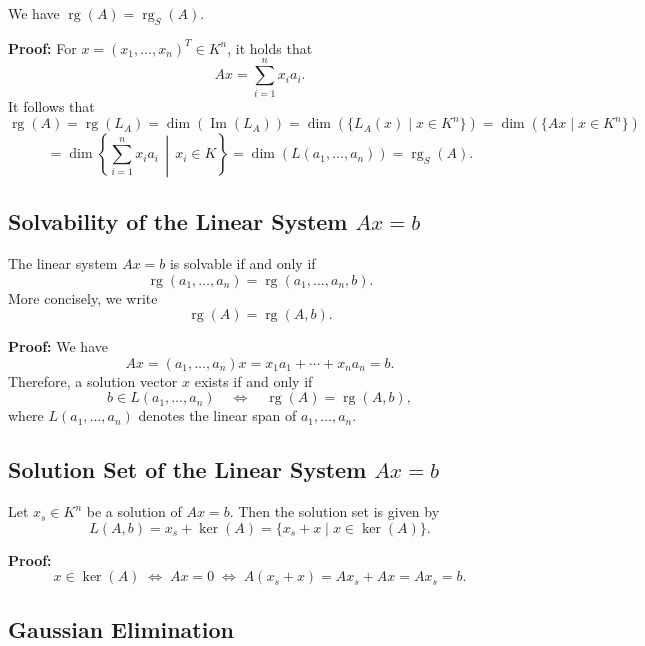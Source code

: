 We have \(\operatorname{rg}(A) = \operatorname{rg}_S(A)\).

\textbf{Proof:} For \(x = {(x_1, \ldots, x_n)}^T \in K^n\), it holds that
\[
Ax = \sum_{i=1}^{n} x_i a_i.
\]
It follows that
\[
\operatorname{rg}(A) = \operatorname{rg}(L_A) = \dim(\operatorname{Im}(L_A))
= \dim\left(\{L_A(x) \mid x \in K^n\}\right)
= \dim\left(\{Ax \mid x \in K^n\}\right)
\]
\[
= \dim\left\{ \sum_{i=1}^{n} x_i a_i \,\middle|\, x_i \in K \right\}
= \dim(L(a_1, \ldots, a_n)) = \operatorname{rg}_S(A).
\]

\subsection{Solvability of the Linear System \texorpdfstring{\(Ax = b\)}{}}

The linear system \(Ax = b\) is solvable if and only if
\[
\operatorname{rg}(a_1, \ldots, a_n) = \operatorname{rg}(a_1, \ldots, a_n, b).
\]
More concisely, we write
\[
\operatorname{rg}(A) = \operatorname{rg}(A, b).
\]

\textbf{Proof:} We have
\[
Ax = (a_1, \ldots, a_n)x = x_1 a_1 + \cdots + x_n a_n = b.
\]
Therefore, a solution vector \(x\) exists if and only if
\[
b \in L(a_1, \ldots, a_n) \quad \Leftrightarrow \quad \operatorname{rg}(A) = \operatorname{rg}(A, b),
\]
where \(L(a_1, \ldots, a_n)\) denotes the linear span of \(a_1, \ldots, a_n\).

\subsection{Solution Set of the Linear System \texorpdfstring{\(Ax = b\)}{}}

Let \(x_s \in K^n\) be a solution of \(Ax = b\). Then the solution set is given by
\[
L(A, b) = x_s + \ker(A) = \{x_s + x \mid x \in \ker(A)\}.
\]

\textbf{Proof:}
\[
x \in \ker(A) \;\Leftrightarrow\; Ax = 0 \;\Leftrightarrow\; A(x_s + x) = Ax_s + Ax = Ax_s = b.
\]


\subsection{Gaussian Elimination}

